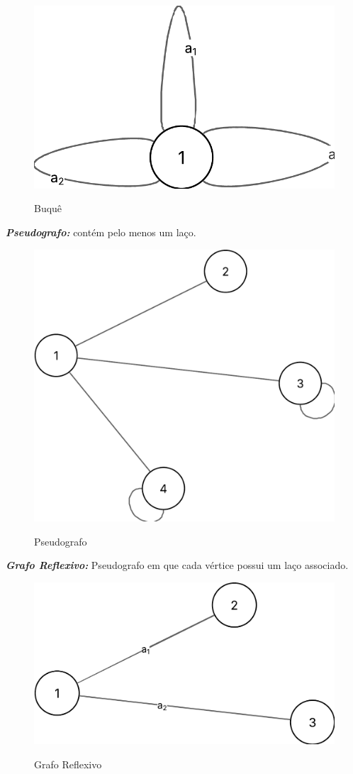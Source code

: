 \begin{figure} [H]
	\centering
	\caption{Buquê}%
	\label{fig:buquê}%
	\includegraphics[width=0.5\linewidth,angle=0]{figuras/tiposgrafos/buque.png}%
	\\
\end{figure}
\textit{\textbf{Pseudografo:}} contém pelo menos um laço. \\
\begin{figure} [H]
	\centering
	\caption{Pseudografo}%
	\label{fig:pseudografo}%
	\includegraphics[width=0.5\linewidth,angle=0]{figuras/tiposgrafos/pseudografo.png}%
	\\
\end{figure}
\textit{\textbf{Grafo Reflexivo:}} Pseudografo em que cada vértice possui um laço associado.\\
\begin{figure} [H]
	\centering
	\caption{Grafo Reflexivo}%
	\label{fig:grafReflex}%
	\includegraphics[width=0.5\linewidth,angle=0]{figuras/tiposgrafos/grafReflex.png}%
	\\
\end{figure}
